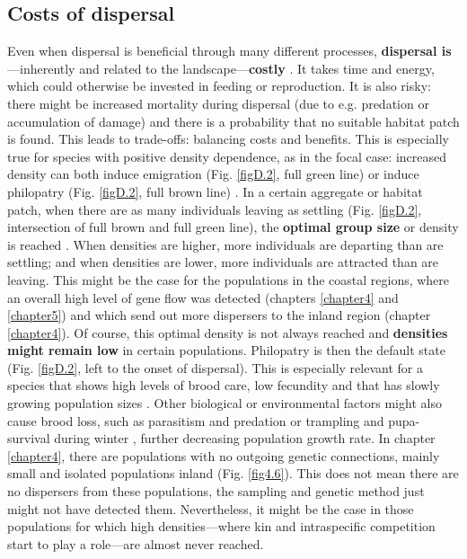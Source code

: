 \documentclass[10pt, twoside]{book} %
\begin{document}
	\subsection{Costs of dispersal}
	Even when dispersal is beneficial through many different processes, \textbf{dispersal is}---inherently and related to the landscape---\textbf{costly} \citep{bonte2010, bonte2012}. It takes time and energy, which could otherwise be invested in feeding or reproduction. It is also risky: there might be increased mortality during dispersal (due to e.g. predation or accumulation of damage) and there is a probability that no suitable habitat patch is found. This leads to trade-offs: balancing costs and benefits. This is especially true for species with positive density dependence, as in the focal case: increased density can both induce emigration (Fig. \ref{figD.2}, full green line) or induce philopatry (Fig. \ref{figD.2}, full brown line) \citep{demeester2010, baguette2011, bitume2013}. In a certain aggregate or habitat patch, when there are as many individuals leaving as settling (Fig. \ref{figD.2}, intersection of full brown and full green line), the \textbf{optimal group size} or density is reached \citep{markham2015}. When densities are higher, more individuals are departing than are settling; and when densities are lower, more individuals are attracted than are leaving. This might be the case for the populations in the coastal regions, where an overall high level of gene flow was detected (chapters \ref{chapter4} and \ref{chapter5}) and which send out more dispersers to the inland region (chapter \ref{chapter4}). Of course, this optimal density is not always reached and \textbf{densities might remain low} in certain populations. Philopatry is then the default state (Fig. \ref{figD.2}, left to the onset of dispersal). This is especially relevant for a species that shows high levels of brood care, low fecundity and  that has slowly growing population sizes \citep[K-selected species;][]{larsson1989, evans2007}. Other biological or environmental factors might also cause brood loss, such as parasitism and predation or trampling and pupa-survival during winter \citep{casiraghi2003, bonte2005}, further decreasing population growth rate. In chapter \ref{chapter4}, there are populations with no outgoing genetic connections, mainly small and isolated populations inland (Fig. \ref{fig4.6}). This does not mean there are no dispersers from these populations, the sampling and genetic method just might not have detected them. Nevertheless, it might be the case in those populations for which high densities---where kin and intraspecific competition start to play a role---are almost never reached.\\
	
\end{document}
